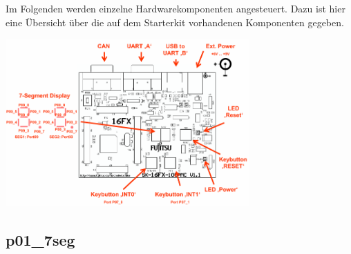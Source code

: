 Im Folgenden werden einzelne Hardwarekomponenten angesteuert. Dazu ist hier eine Übersicht über die auf dem Starterkit vorhandenen Komponenten gegeben.
\begin{center}\includegraphics[width=0.7\textwidth]{starterkit}\end{center}

\subsection{p01\_7seg}
\label{exercise7Segment}

